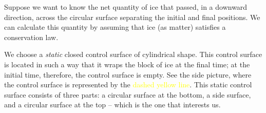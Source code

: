 \documentclass[a4paper,12pt,%
onecolumn,oneside,titlepage,%
british%
]{memoir}
\renewcommand*{\|}[1][]{\nonscript\:#1\vert\nonscript\:\mathopen{}}
\begin{document}
Suppose we want to know the net quantity of ice that passed, in a downward direction, across the circular surface separating the initial and final positions. We can calculate this quantity by assuming that ice (as matter) satisfies a conservation law.

We choose a \emph{static} closed control surface of cylindrical shape.
%
This control surface is located in such a way that it wraps the block of ice at the final time; at the initial time, therefore, the control surface is empty. See the side picture, where the control surface is represented by the \textcolor{yellow}{dashed yellow line}. This static control surface consists of three parts: a circular surface at the bottom, a side surface, and a circular surface at the top -- which is the one that interests us.
\end{document}
